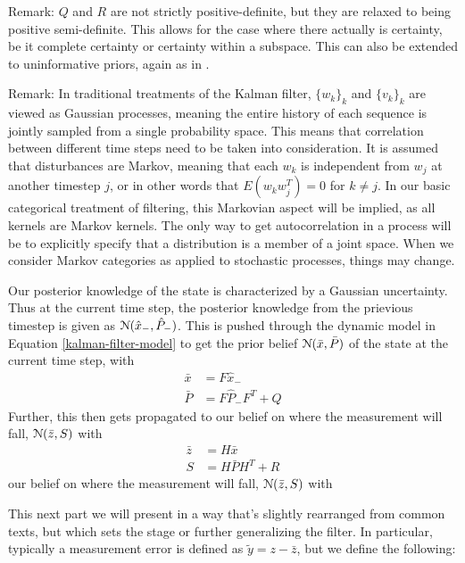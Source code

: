 Remark: $Q$ and $R$ are not strictly positive-definite, but they are relaxed to being positive semi-definite. This allows for the case where there actually is certainty, be it complete certainty or certainty within a subspace. This can also be extended to uninformative priors, again as in \cite{extended-gaussian}.

Remark: In traditional treatments of the Kalman filter, $\{w_k\}_k$ and $\{v_k\}_k$ are viewed as Gaussian processes, meaning the entire history of each sequence is jointly sampled from a single probability space. This means that correlation between different time steps need to be taken into consideration. It is assumed that disturbances are Markov, meaning that each $w_k$ is independent from $w_j$ at another timestep $j$, or in other words that $E(w_kw_j^T) = 0$ for $k\neq j$. In our basic categorical treatment of filtering, this Markovian aspect will be implied, as all kernels are Markov kernels. The only way to get autocorrelation in a process will be to explicitly specify that a distribution is a member of a joint space. When we consider Markov categories as applied to stochastic processes, things may change.

Our posterior knowledge of the state is characterized by a Gaussian uncertainty.
Thus at the current time step, the posterior knowledge from the prievious timestep is given as $\mathcal{N}(\hat{x}_-, \hat{P}_-)$.
This is pushed through the dynamic model in Equation \ref{kalman-filter-model} to get the prior belief $\mathcal{N}(\bar{x}, \bar{P})$ of the state at the current time step, with
\begin{align}
	\label{kalman-filter-dynamics-push}
	\bar{x} &= F\hat{x}_-\\
	\bar{P} &= F\hat{P}_- F^T + Q
\end{align}
Further, this then gets propagated to our belief on where the measurement will fall, $\mathcal{N}(\bar{z}, S)$ with
\begin{align}
	\label{kalman-filter-measurement-push}
	\bar{z} &= H\bar{x}\\
	S &= H\bar{P} H^T + R
\end{align}
our belief on where the measurement will fall, $\mathcal{N}(\bar{z}, S)$ with

This next part we will present in a way that's slightly rearranged from common texts, but which sets the stage or further generalizing the filter.
In particular, typically a measurement error is defined as $\tilde{y} = z - \bar{z}$, but we define the following:

